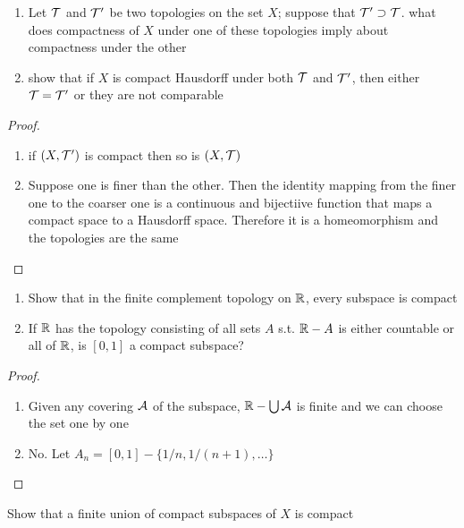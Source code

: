 \documentclass[11pt]{article}
\begin{document}
\begin{exercise}
\label{ex26.1}
\begin{enumerate}
\item Let \(\mathcal{T}\) and \(\mathcal{T}'\) be two topologies on the set \(X\); suppose that \(\mathcal{T}'\supset\mathcal{T}\). what does
compactness of \(X\) under one of these topologies imply about compactness under the other
\item show that if \(X\) is compact Hausdorff under both \(\mathcal{T}\) and \(\mathcal{T}'\), then either \(\mathcal{T}=\mathcal{T}'\) or
they are not comparable
\end{enumerate}
\end{exercise}

\begin{proof}
\begin{enumerate}
\item if \((X,\mathcal{T}')\) is compact then so is \((X,\mathcal{T})\)
\item Suppose one is finer than the other. Then the identity mapping from the finer one to the
coarser one is a continuous and bijectiive function that maps a compact space to a Hausdorff
space. Therefore it is a homeomorphism and the topologies are the same
\end{enumerate}
\end{proof}

\begin{exercise}
\label{ex26.2}
\begin{enumerate}
\item Show that in the finite complement topology on \(\mathbb{R}\), every subspace is compact
\item If \(\mathbb{R}\) has the topology consisting of all sets \(A\) s.t. \(\mathbb{R}-A\) is either countable or all
of \(\mathbb{R}\), is \([0,1]\) a compact subspace?
\end{enumerate}
\end{exercise}

\begin{proof}
\begin{enumerate}
\item Given any covering \(\mathcal{A}\) of the subspace, \(\mathbb{R}-\bigcup\mathcal{A}\) is finite and we can choose the set one by one
\item No. Let \(A_n=[0,1]-\{1/n,1/(n+1),\dots\}\)
\end{enumerate}
\end{proof}

\begin{exercise}
\label{ex26.3}
Show that a finite union of compact subspaces of \(X\) is compact
\end{exercise}
\end{document}
